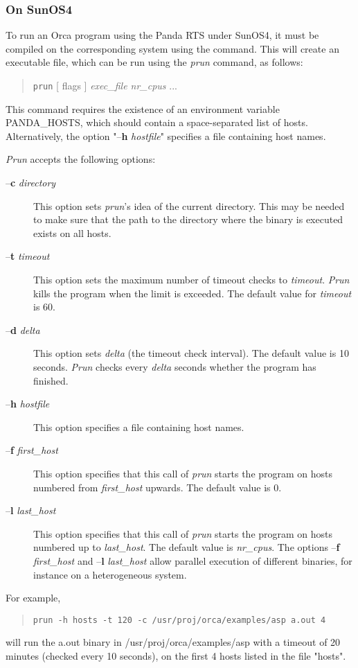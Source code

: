 \documentclass[10pt]{article}
\begin{document}
\subsubsection{On SunOS4}

To run an Orca program using the Panda RTS under SunOS4, it
must be compiled on the corresponding system using the
{}
{}
command.
This will create an executable file, which can be run using the
{\em prun} command, as follows:
\begin{quote}
\verb+prun+ [ flags ] {\em exec\_file nr\_cpus} ...
\end{quote}
This command requires the existence of an environment variable PANDA\_HOSTS,
which should contain a space-separated list of hosts.
Alternatively, the option "--{\bf h} {\em hostfile}"
specifies a file containing host names.

{\em Prun} accepts the following options:
\begin{description}
\item[--{\bf c} {\em directory}]
This option sets {\em prun}'s idea of the current directory.
This may be needed to make sure that the path to the directory where the
binary is executed exists on all hosts.
\item[--{\bf t} {\em timeout}]
This option sets the maximum number of timeout checks to {\em timeout}.
{\em Prun} kills the program when the limit is exceeded.
The default value for {\em timeout} is 60.
\item[--{\bf d} {\em delta}]
This option sets {\em delta} (the timeout check interval). 
The default value is 10 seconds.
{\em Prun}
checks every {\em delta} seconds whether the program has finished.
\item[--{\bf h} {\em hostfile}]
This option specifies a file containing host names.
\item[--{\bf f} {\em first\_host}]
This option specifies that this call of {\em prun} starts the program on hosts
numbered from {\em first\_host} upwards. The default value is 0.
\item[--{\bf l} {\em last\_host}]
This option specifies that this call of {\em prun} starts the program on hosts
numbered up to {\em last\_host}. The default value is {\em nr\_cpus}. The options
--{\bf f} {\em first\_host} and --{\bf l} {\em last\_host} 
allow parallel execution of
different binaries, for instance on a heterogeneous system.
\end{description}
For example,
\begin{quote}
\begin{verbatim}
prun -h hosts -t 120 -c /usr/proj/orca/examples/asp a.out 4
\end{verbatim}
\end{quote}
will run the a.out binary in /usr/proj/orca/examples/asp with a timeout
of 20 minutes (checked every 10 seconds), on the first 4 hosts listed in
the file "hosts".
\end{document}
